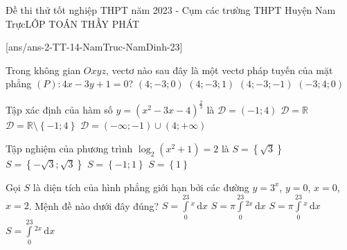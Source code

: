 \begin{name}
	{\tenchude}{Đề thi thử tốt nghiệp THPT năm 2023 - Cụm các trường THPT Huyện Nam Trực}{LỚP TOÁN THẦY PHÁT}{\thoigian}	
\end{name}
\setcounter{ex}{0}\setcounter{bt}{0}
[ans/ans-2-TT-14-NamTruc-NamDinh-23]
\begin{ex}%
	Trong không gian $Oxyz$, vectơ nào sau đây là một vectơ pháp tuyến của mặt phẳng $(P)\colon 4x-3y+1=0$?
	\choice
	{\True $\left(4;-3;0\right)$}
	{$\left(4;-3;1\right)$}
	{$\left(4;-3;-1\right)$}
	{$\left(-3;4;0\right)$}
\end{ex}
\begin{ex}%
	Tập xác định của hàm số $y=\left(x^2-3x-4\right)^{\tfrac{2}{3}}$ là
	\choice
	{$\mathscr{D}=\left(-1;4\right)$}
	{$\mathscr{D}=\mathbb{R}$}
	{$\mathscr{D}=\mathbb{R}\setminus\left\lbrace -1;4\right\rbrace $}
	{\True $\mathscr{D}=\left(-\infty;-1\right)\cup\left(4;+\infty\right)$}
\end{ex}
\begin{ex}%
	Tập nghiệm của phương trình $\log_2\left(x^2+1\right)=2$ là
	\choice
	{$S=\left\lbrace \sqrt{3}\right\rbrace $}
	{\True $S=\left\lbrace -\sqrt{3};\sqrt{3}\right\rbrace $}
	{$S=\left\lbrace -1;1\right\rbrace $}
	{$S=\left\lbrace 1\right\rbrace $}
\end{ex}
\begin{ex}%
Gọi $S$ là diện tích của hình phẳng giới hạn bởi các đường $y=3^x$, $y=0$, $x=0$, $x=2$. Mệnh đề nào dưới đây đúng?
\choice
{\True $S=\displaystyle\int\limits_0^23^x\mathrm{\,d}x$}
{$S=\pi\displaystyle\int\limits_0^23^{2x}\mathrm{\,d}x$}
{$S=\pi\displaystyle\int\limits_0^23^x\mathrm{\,d}x$}
{$S=\displaystyle\int\limits_0^23^{2x}\mathrm{\,d}x$}
\end{ex}
